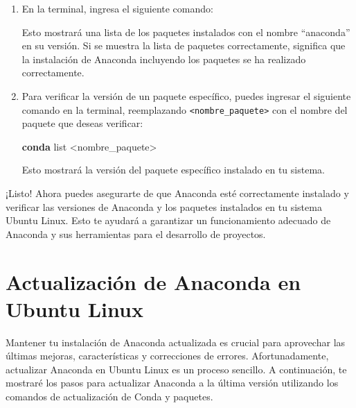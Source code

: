 \documentclass[
  a4paper,
]{article}
\newenvironment{Shaded}{}{}
\newcommand{\ExtensionTok}[1]{\textcolor[rgb]{0.84,0.23,0.29}{\textbf{#1}}}
\newcommand{\NormalTok}[1]{\textcolor[rgb]{0.14,0.16,0.18}{#1}}
\newcommand{\OperatorTok}[1]{\textcolor[rgb]{0.14,0.16,0.18}{#1}}
\begin{document}
\begin{enumerate}
\def\labelenumi{\arabic{enumi}.}
\item
  En la terminal, ingresa el siguiente comando:

\begin{Shaded}
\end{Shaded}

  Esto mostrará una lista de los paquetes instalados con el nombre
  ``anaconda'' en su versión. Si se muestra la lista de paquetes
  correctamente, significa que la instalación de Anaconda incluyendo los
  paquetes se ha realizado correctamente.
\item
  Para verificar la versión de un paquete específico, puedes ingresar el
  siguiente comando en la terminal, reemplazando
  \texttt{\textless{}nombre\_paquete\textgreater{}} con el nombre del
  paquete que deseas verificar:

\begin{Shaded}
\begin{Highlighting}[]
\ExtensionTok{conda}\NormalTok{ list }\OperatorTok{\textless{}}\NormalTok{nombre\_paquete}\OperatorTok{\textgreater{}}
\end{Highlighting}
\end{Shaded}

  Esto mostrará la versión del paquete específico instalado en tu
  sistema.
\end{enumerate}

¡Listo! Ahora puedes asegurarte de que Anaconda esté correctamente
instalado y verificar las versiones de Anaconda y los paquetes
instalados en tu sistema Ubuntu Linux. Esto te ayudará a garantizar un
funcionamiento adecuado de Anaconda y sus herramientas para el
desarrollo de proyectos.

\hypertarget{actualizaciuxf3n-de-anaconda-en-ubuntu-linux}{%
\section{Actualización de Anaconda en Ubuntu
Linux}\label{actualizaciuxf3n-de-anaconda-en-ubuntu-linux}}

Mantener tu instalación de Anaconda actualizada es crucial para
aprovechar las últimas mejoras, características y correcciones de
errores. Afortunadamente, actualizar Anaconda en Ubuntu Linux es un
proceso sencillo. A continuación, te mostraré los pasos para actualizar
Anaconda a la última versión utilizando los comandos de actualización de
Conda y paquetes.
\end{document}
